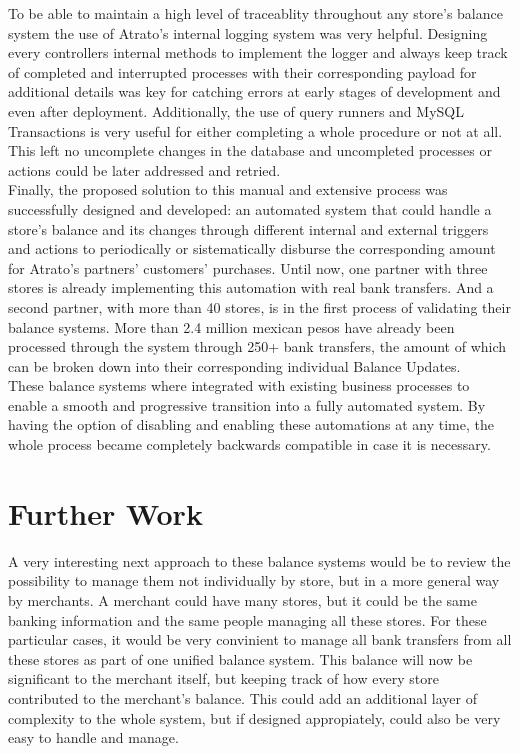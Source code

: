 To be able to maintain a high level of traceablity throughout any store's balance system the use of Atrato's internal logging system was very helpful. Designing every controllers internal methods to implement the logger and always keep track of completed and interrupted processes with their corresponding payload for additional details was key for catching errors at early stages of development and even after deployment. Additionally, the use of query runners and MySQL Transactions is very useful for either completing a whole procedure or not at all. This left no uncomplete changes in the database and uncompleted processes or actions could be later addressed and retried.\\

Finally, the proposed solution to this manual and extensive process was successfully designed and developed: an automated system that could handle a store's balance and its changes through different internal and external triggers and actions to periodically or sistematically disburse the corresponding amount for Atrato's partners' customers' purchases. Until now, one partner with three stores is already implementing this automation with real bank transfers. And a second partner, with more than 40 stores, is in the first process of validating their balance systems. More than 2.4 million mexican pesos have already been processed through the system through 250+ bank transfers, the amount of which can be broken down into their corresponding individual Balance Updates.\\

These balance systems where integrated with existing business processes to enable a smooth and progressive transition into a fully automated system. By having the option of disabling and enabling these automations at any time, the whole process became completely backwards compatible in case it is necessary.\\


\section{Further Work}

A very interesting next approach to these balance systems would be to review the possibility to manage them not individually by store, but in a more general way by merchants. A merchant could have many stores, but it could be the same banking information and the same people managing all these stores. For these particular cases, it would be very convinient to manage all bank transfers from all these stores as part of one unified balance system. This balance will now be significant to the merchant itself, but keeping track of how every store contributed to the merchant's balance. This could add an additional layer of complexity to the whole system, but if designed appropiately, could also be very easy to handle and manage.\\ 

